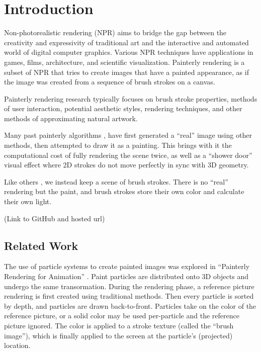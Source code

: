 \documentclass[conference]{acmsiggraph}
\begin{document}

\copyrightspace

\section{Introduction}

Non-photorealistic rendering (NPR) aims to bridge the gap between the
creativity and expressivity of traditional art and the interactive and
automated world of digital computer graphics. Various NPR techniques have
applications in games, films, architecture, and scientific visualization.
Painterly rendering is a subset of NPR that tries to create images that have a
painted appearance, as if the image was created from a sequence of brush
strokes on a canvas.

Painterly rendering research typically focuses on brush stroke properties,
methods of user interaction, potential aesthetic styles, rendering techniques,
and other methods of approximating natural artwork.

Many past painterly algorithms \cite{Hertzmann:1998:PRC:280814.280951},
\cite{Lu:2010:IPS:1730804.1730825} have first generated a ``real'' image using
other methods, then attempted to draw it as a painting. This brings with it the
computational cost of fully rendering the scene twice, as well as a
``shower door'' visual effect where 2D strokes do not move perfectly in sync
with 3D geometry.

Like others \cite{Meier:1996:PRA:237170.237288}, we instead keep a scene of
brush strokes. There is no ``real'' rendering but the paint, and brush strokes
store their own color and calculate their own light.

(Link to GitHub and hosted url)


\subsection{Related Work}

The use of particle systems to create painted images was explored in
``Painterly Rendering for Animation'' \cite{Meier:1996:PRA:237170.237288}.
Paint particles are distributed onto 3D objects and undergo the same
transormation. During the rendering phase, a reference picture rendering is
first created using traditional methods. Then every particle is sorted by
depth, and particles are drawn back-to-front. Particles take on the color of
the reference picture, or a solid color may be used per-particle and the
reference picture ignored. The color is applied to a stroke texture (called
the ``brush image''), which is finally applied to the screen at the particle's
(projected) location.
\end{document}
